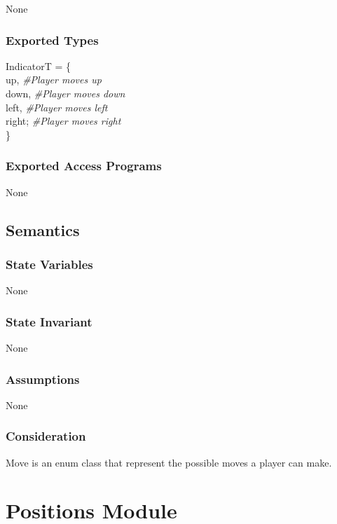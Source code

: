 \documentclass[12pt]{article}
\begin{document}
None

\subsubsection* {Exported Types}

IndicatorT = \{\\
    up, \textit{\#Player moves up}\\
    down, \textit{\#Player moves down}\\
    left, \textit{\#Player moves left}\\
    right; \textit{\#Player moves right}\\
\}

\subsubsection* {Exported Access Programs}

None

\subsection* {Semantics}

\subsubsection* {State Variables}

None

\subsubsection* {State Invariant}

None

\subsubsection* {Assumptions}

None

\subsubsection* {Consideration}

Move is an enum class that represent the possible moves a player can make.

\newpage

\section* {Positions Module}
\end{document}

